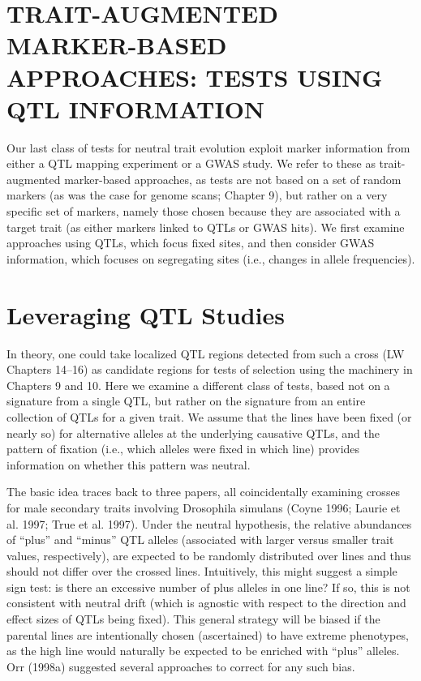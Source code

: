 \documentclass{article}
\begin{document}
\section{TRAIT-AUGMENTED MARKER-BASED APPROACHES: TESTS USING QTL INFORMATION}
Our last class of tests for neutral trait evolution exploit marker information from either a QTL mapping experiment or a GWAS study. We refer to these as trait-augmented marker-based approaches, as tests are not based on a set of random markers (as was the case for genome scans; Chapter 9), but rather on a very specific set of markers, namely those chosen because they are associated with a target trait (as either markers linked to QTLs or GWAS hits). We first examine approaches using QTLs, which focus fixed sites, and then consider GWAS information, which focuses on segregating sites (i.e., changes in allele frequencies).

\section{Leveraging QTL Studies}
In theory, one could take localized QTL regions detected from such a cross (LW Chapters 14–16) as candidate regions for tests of selection using the machinery in Chapters 9 and 10. Here we examine a different class of tests, based not on a signature from a single QTL, but rather on the signature from an entire collection of QTLs for a given trait. We assume that the lines have been fixed (or nearly so) for alternative alleles at the underlying causative QTLs, and the pattern of fixation (i.e., which alleles were fixed in which line) provides information on whether this pattern was neutral.

The basic idea traces back to three papers, all coincidentally examining crosses for male secondary traits involving Drosophila simulans (Coyne 1996; Laurie et al. 1997; True et al. 1997). Under the neutral hypothesis, the relative abundances of “plus” and “minus” QTL alleles (associated with larger versus smaller trait values, respectively), are expected to be randomly distributed over lines and thus should not differ over the crossed lines. Intuitively, this might suggest a simple sign test: is there an excessive number of plus alleles in one line? If so, this is not consistent with neutral drift (which is agnostic with respect to the direction and effect sizes of QTLs being fixed). This general strategy will be biased if the parental lines are intentionally chosen (ascertained) to have extreme phenotypes, as the high line would naturally be expected to be enriched with “plus” alleles. Orr (1998a) suggested several approaches to correct for any such bias.
\end{document}
